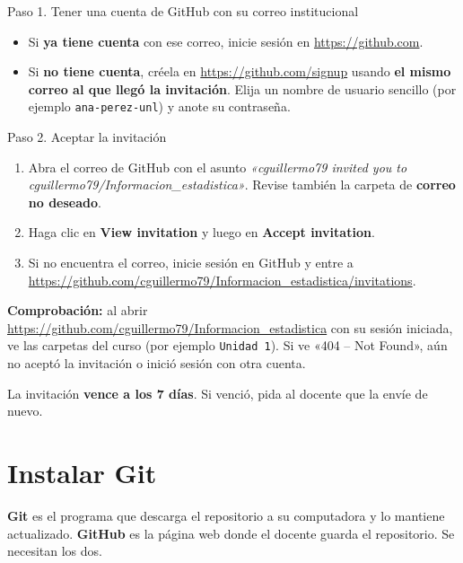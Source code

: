 \documentclass[11pt,a4paper]{article}
\begin{document}
\begin{paso}{Paso 1. Tener una cuenta de GitHub con su correo institucional}
\begin{itemize}[leftmargin=*]
  \item Si \textbf{ya tiene cuenta} con ese correo, inicie sesión en \url{https://github.com}.
  \item Si \textbf{no tiene cuenta}, créela en \url{https://github.com/signup} usando \textbf{el mismo correo al que llegó la invitación}. Elija un nombre de usuario sencillo (por ejemplo \texttt{ana-perez-unl}) y anote su contraseña.
\end{itemize}
\end{paso}

\begin{paso}{Paso 2. Aceptar la invitación}
\begin{enumerate}[leftmargin=*]
  \item Abra el correo de GitHub con el asunto \emph{«cguillermo79 invited you to cguillermo79/Informacion\_estadistica»}. Revise también la carpeta de \textbf{correo no deseado}.
  \item Haga clic en \textbf{View invitation} y luego en \textbf{Accept invitation}.
  \item Si no encuentra el correo, inicie sesión en GitHub y entre a \url{https://github.com/cguillermo79/Informacion_estadistica/invitations}.
\end{enumerate}
\textbf{Comprobación:} al abrir \url{https://github.com/cguillermo79/Informacion_estadistica} con su sesión iniciada, ve las carpetas del curso (por ejemplo \texttt{Unidad 1}). Si ve «404 -- Not Found», aún no aceptó la invitación o inició sesión con otra cuenta.
\end{paso}

\begin{nota}
La invitación \textbf{vence a los 7 días}. Si venció, pida al docente que la envíe de nuevo.
\end{nota}

\section{Instalar Git}

\textbf{Git} es el programa que descarga el repositorio a su computadora y lo mantiene actualizado. \textbf{GitHub} es la página web donde el docente guarda el repositorio. Se necesitan los dos.
\end{document}
